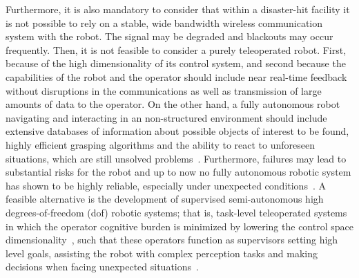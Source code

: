 	Furthermore, it is also mandatory to consider that within a disaster-hit facility it is not possible
	to rely on a stable, wide bandwidth wireless communication system with the robot.
	The signal may be degraded and blackouts may occur frequently.
	Then, it is not feasible to consider a purely teleoperated robot.
	First, because of the high dimensionality of its control system, and second because the capabilities of
	the robot and the operator should include near real-time feedback without disruptions in the communications
	as well as transmission of large amounts of data to the operator.
	On the other hand, a fully autonomous robot navigating and interacting in an non-structured environment
	should include extensive databases of information about possible objects of interest to be found,
	highly efficient grasping algorithms and the ability to react to unforeseen situations,
	which are still unsolved problems~\cite{Romay}.
	Furthermore, failures may lead to substantial risks for the robot and up to now no fully autonomous robotic
	system has shown to be highly	reliable,	especially under unexpected conditions~\cite{Stormont}.
	A feasible alternative is the development of supervised semi-autonomous high degrees-of-freedom (dof)
	robotic systems; that is, task-level teleoperated systems in which the operator cognitive burden is
	minimized by lowering the control space dimensionality~\cite{Katyal}, such that these operators function
	as supervisors setting high level goals, assisting the robot with complex perception tasks and making
	decisions when facing unexpected situations~\cite{Kohlbrecher}.